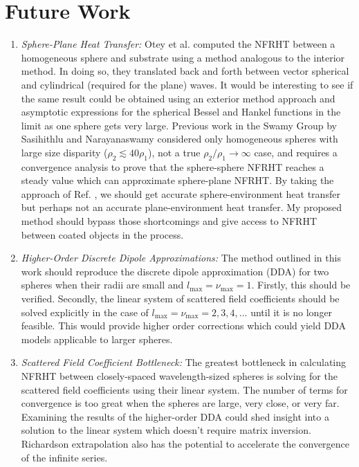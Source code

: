 \section{Future Work}
%
\begin{enumerate}
\item \textit{Sphere-Plane Heat Transfer:} Otey et al.\cite{Otey2011} computed the NFRHT between a homogeneous sphere and substrate using a method analogous to the interior method. In doing so, they translated back and forth between vector spherical and cylindrical (required for the plane) waves. It would be interesting to see if the same result could be obtained using an exterior method approach and asymptotic expressions for the spherical Bessel and Hankel functions in the limit as one sphere gets very large. Previous work in the Swamy Group by Sasihithlu and Narayanaswamy\cite{Sasihithlu2014} considered only homogeneous spheres with large size disparity ($\rho_{2} \lesssim 40 \rho_{1}$), not a true $\rho_{2}/\rho_{1} \rightarrow \infty$ case, and requires a convergence analysis to prove that the sphere-sphere NFRHT reaches a steady value which can approximate sphere-plane NFRHT. By taking the approach of Ref. , we should get accurate sphere-environment heat transfer but perhaps not an accurate plane-environment heat transfer. My proposed method should bypass those shortcomings and give access to NFRHT between coated objects in the process.
\item \textit{Higher-Order Discrete Dipole Approximations:} The method outlined in this work should reproduce the discrete dipole approximation (DDA) for two spheres when their radii are small and $l_{\mathrm{max}} = \nu_{\mathrm{max}} = 1.$ Firstly, this should be verified. Secondly, the linear system of scattered field coefficients should be solved explicitly in the case of $l_{\mathrm{max}} = \nu_{\mathrm{max}} =2, 3, 4,... $ until it is no longer feasible. This would provide higher order corrections which could yield DDA models applicable to larger spheres.
\item \textit{Scattered Field Coefficient Bottleneck:} The greatest bottleneck in calculating NFRHT between closely-spaced wavelength-sized spheres is solving for the scattered field coefficients using their linear system. The number of terms for convergence is too great when the spheres are large, very close, or very far. Examining the results of the higher-order DDA could shed insight into a solution to the linear system which doesn't require matrix inversion. Richardson extrapolation also has the potential to accelerate the convergence of the infinite series.

\end{enumerate}
